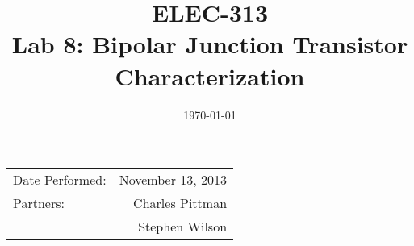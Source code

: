 \documentclass{article}
\author{}
\title{ELEC-313 \\ Lab 8: Bipolar Junction Transistor Characterization\\ }
\date{\today}
\begin{document}
\maketitle

\begin{center}
  \begin{tabular}{lr}
    Date Performed: & November 13, 2013 \\
    Partners:       & Charles Pittman    \\
    & Stephen Wilson     \\
  \end{tabular}
\end{center}

\newpage


\end{document}
